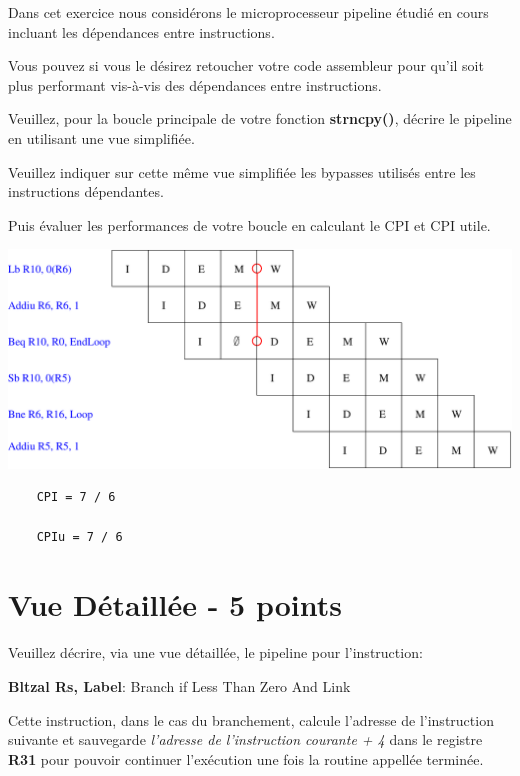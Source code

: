 Dans cet exercice nous consid\'erons le microprocesseur pipeline \'etudi\'e
en cours incluant les d\'ependances entre instructions.

Vous pouvez si vous le d\'esirez retoucher votre code assembleur
pour qu'il soit plus performant vis-\`a-vis des d\'ependances entre
instructions.

Veuillez, pour la boucle principale de votre fonction \textbf{strncpy()},
d\'ecrire le pipeline en utilisant une vue simplifi\'ee.

Veuillez indiquer sur cette m\^eme vue simplifi\'ee les bypasses utilis\'es
entre les instructions d\'ependantes.

Puis \'evaluer les performances de votre boucle en calculant le CPI et CPI
utile.

\begin{correction}

  \begin{center}
    \includegraphics[scale=0.8]{figures/correction-vue-simplifiee.pdf}
  \end{center}

  \begin{verbatim}
    CPI = 7 / 6

    CPIu = 7 / 6
  \end{verbatim}

\end{correction}

%
%

\section{Vue D\'etaill\'ee - 5 points}

Veuillez d\'ecrire, via une vue d\'etaill\'ee, le pipeline pour l'instruction:

\textbf{Bltzal Rs, Label}: Branch if Less Than Zero And Link

Cette instruction, dans le cas du branchement, calcule l'adresse de
l'instruction suivante et sauvegarde \textit{l'adresse de l'instruction
courante + 4} dans le registre \textbf{R31} pour pouvoir continuer
l'ex\'ecution une fois la routine appell\'ee termin\'ee.

